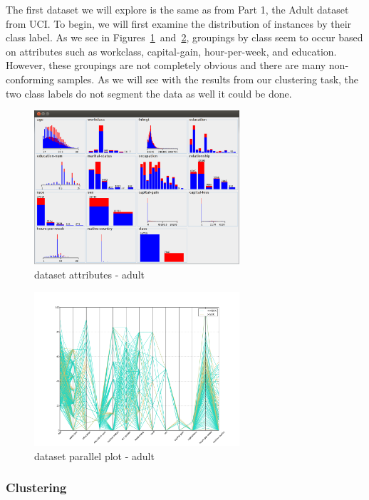 \documentclass{sig-alternate}
\begin{document}
The first dataset we will explore is the same as from Part 1, the Adult dataset from UCI. To begin, we will first examine the distribution of instances by their class label. As we see in Figures~\ref{adult-attr-class}~and~\ref{adult-parallel-class}, groupings by class seem to occur based on attributes such as workclass, capital-gain, hour-per-week, and education. However, these groupings are not completely obvious and there are many non-conforming samples. As we will see with the results from our clustering task, the two class labels do not segment the data as well it could be done.

\begin{figure}[!htbp]
    \centering
    \includegraphics[width=3in]{part2/adult/attr-class.pdf}
    \caption{dataset attributes - adult\label{adult-attr-class}}
\end{figure} 

\begin{figure}[!htbp]
    \centering
    \includegraphics[width=3in]{part2/adult/parallel-class.pdf}
    \caption{dataset parallel plot - adult\label{adult-parallel-class}}
\end{figure} 

\subsubsection{Clustering}
\end{document}
